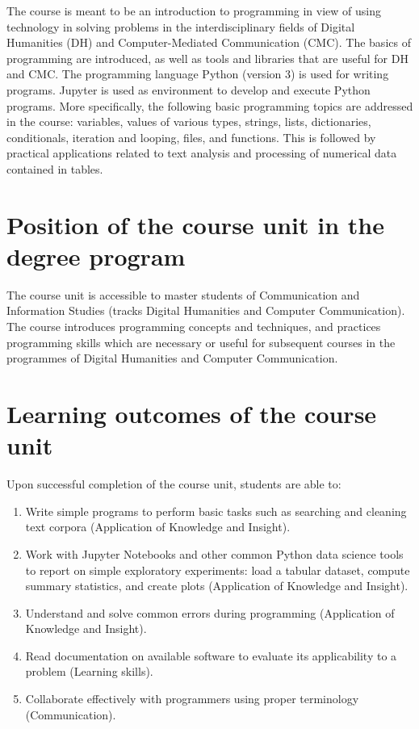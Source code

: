 \documentclass[a4paper,12pt]{article}
\begin{document}
The course is meant to be an introduction to programming in view of using
technology in solving problems in the interdisciplinary fields of Digital
Humanities (DH) and Computer-Mediated Communication (CMC). The basics of
programming are introduced, as well as tools and libraries
that are useful for DH and CMC. The programming language Python
(version 3) is used for writing programs. Jupyter is used as environment to
develop and execute Python programs. More specifically, the following basic
programming topics are addressed in the course: variables, values of various
types, strings, lists, dictionaries, conditionals, iteration and looping,
files, and functions. This is followed by practical applications related to
text analysis and processing of numerical data contained in tables.

\section{Position of the course unit in the degree program}
The course unit is accessible to master students of Communication and
Information Studies (tracks Digital Humanities and Computer Communication).
The course introduces programming concepts and techniques, and practices
programming skills which are necessary or useful for subsequent courses in the
programmes of Digital Humanities and Computer Communication.

\section{Learning outcomes of the course unit}

Upon successful completion of the course unit, students are able to:

\begin{enumerate}
    \item Write simple programs to perform basic tasks such as searching and
        cleaning text corpora
        (Application of Knowledge and Insight).
    \item Work with Jupyter Notebooks and other common Python data science
        tools to report on simple exploratory experiments: load a tabular
        dataset, compute summary statistics, and create plots
        (Application of Knowledge and Insight).
    \item Understand and solve common errors during programming
        (Application of Knowledge and Insight).
    \item Read documentation on available software to evaluate its
        applicability to a problem
        (Learning skills).
    \item Collaborate effectively with programmers using proper terminology
        (Communication).
\end{enumerate}
\end{document}
